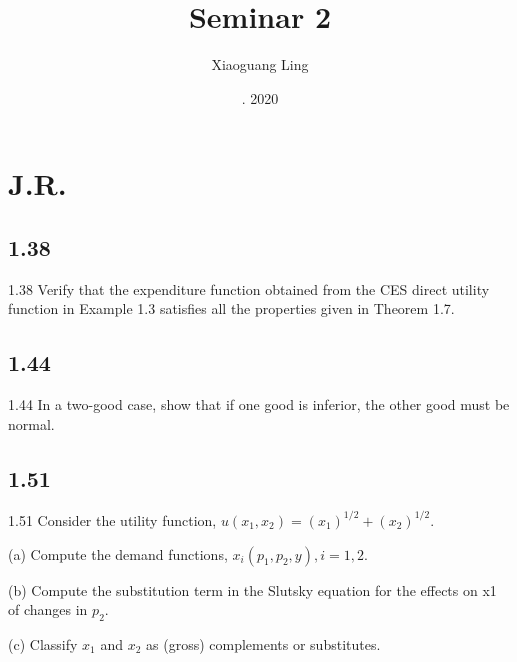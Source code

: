 \documentclass{article}
\title{Seminar 2}
\author{Xiaoguang Ling }
\date{. 2020}
\begin{document}
\maketitle

\section{J.R. }

\subsection{1.38}
1.38 Verify that the expenditure function obtained from the CES direct utility function in Example 1.3
satisfies all the properties given in Theorem 1.7.


\subsection{1.44}
1.44 In a two-good case, show that if one good is inferior, the other good must be normal.


\subsection{1.51}

1.51 Consider the utility function, $u(x_1, x_2) = (x_1)^{1/2} + (x_2)^{1/2}$.

(a) Compute the demand functions, $x_i(p_1, p_2, y), i = 1, 2$.

(b) Compute the substitution term in the Slutsky equation for the effects on x1 of changes in $p_2$.

(c) Classify $x_1$ and $x_2$ as (gross) complements or substitutes.
\end{document}
